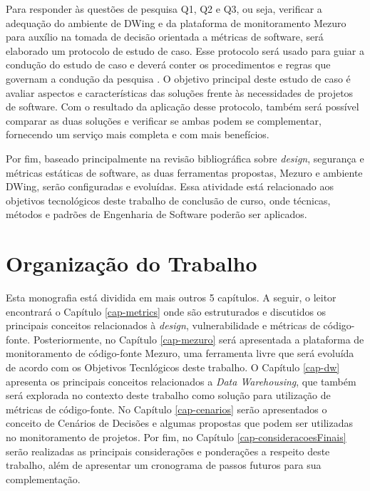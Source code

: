 Para responder às questões de pesquisa Q1, Q2 e Q3, ou seja, verificar a adequação do ambiente de DWing e da plataforma de monitoramento Mezuro para auxílio na tomada de decisão orientada a métricas de software, será elaborado um protocolo de estudo de caso.
%
Esse protocolo será usado para guiar a condução do estudo de caso e deverá conter os procedimentos e regras que governam a condução da pesquisa \cite{miles1994}.
%
O objetivo principal deste estudo de caso é avaliar aspectos e características das soluções frente às necessidades de projetos de software.
%
Com o resultado da aplicação desse protocolo, também será possível comparar as duas soluções e verificar se ambas podem se complementar, fornecendo um serviço mais completa e com mais benefícios.

Por fim, baseado principalmente na revisão bibliográfica sobre \emph{design}, segurança e métricas estáticas de software, as duas ferramentas propostas, Mezuro e ambiente DWing, serão configuradas e evoluídas.
%
Essa atividade está relacionado aos objetivos tecnológicos deste trabalho de conclusão de curso, onde técnicas, métodos e padrões de Engenharia de Software poderão ser aplicados.


\section{Organização do Trabalho}

Esta monografia está dividida em mais outros 5 capítulos. A seguir, o leitor encontrará o Capítulo \ref{cap-metrics} onde são estruturados e discutidos os principais conceitos relacionados à \emph{design}, vulnerabilidade e métricas de código-fonte. Posteriormente, no Capítulo \ref{cap-mezuro} será apresentada a plataforma de monitoramento de código-fonte Mezuro, uma ferramenta livre que será evoluída de acordo com os Objetivos Tecnlógicos deste trabalho. O Capítulo \ref{cap-dw} apresenta os principais conceitos relacionados a \emph{Data Warehousing}, que também será explorada no contexto deste trabalho como solução para utilização de métricas de código-fonte. No Capítulo \ref{cap-cenarios} serão apresentados o conceito de Cenários de Decisões e algumas propostas que podem ser utilizadas no monitoramento de projetos. Por fim, no Capítulo \ref{cap-consideracoesFinais} serão realizadas as principais considerações e ponderações a respeito deste trabalho, além de apresentar um cronograma de passos futuros para sua complementação.
